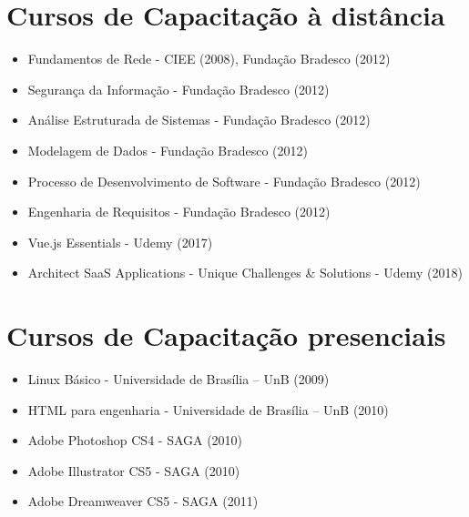 \section{Cursos de Capacitação à distância}
\begin{itemize}
    \item Fundamentos de Rede - CIEE (2008), Fundação Bradesco (2012)
    \item Segurança da Informação - Fundação Bradesco (2012)
    \item Análise Estruturada de Sistemas - Fundação Bradesco (2012)
    \item Modelagem de Dados - Fundação Bradesco (2012)
    \item Processo de Desenvolvimento de Software - Fundação Bradesco (2012)
    \item Engenharia de Requisitos - Fundação Bradesco (2012)
    \item Vue.js Essentials - Udemy (2017)
    \item Architect SaaS Applications - Unique Challenges & Solutions - Udemy (2018)
\end{itemize}

\section{Cursos de Capacitação presenciais}
\begin{itemize}
    \item Linux Básico - Universidade de Brasília – UnB (2009)
    \item HTML para engenharia - Universidade de Brasília – UnB (2010)
    \item Adobe Photoshop CS4 - SAGA (2010)
    \item Adobe Illustrator CS5 - SAGA (2010)
    \item Adobe Dreamweaver CS5 - SAGA (2011)
\end{itemize}